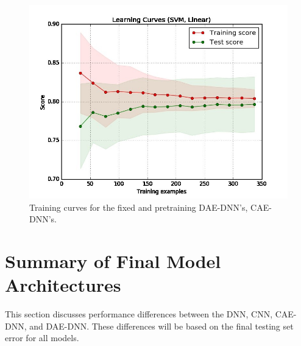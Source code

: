 \begin{figure}[H]
	\centering
	\includegraphics[width=0.8\linewidth]{model_choice_hyperparameter_search_images/learning_curve_dummy}
	\caption{Training curves for the fixed and pretraining DAE-DNN's, CAE-DNN's.}
	\label{fig:learning_curves}
\end{figure}




\section{Summary of Final Model Architectures}


This section discusses performance differences between the DNN, CNN, CAE-DNN, and DAE-DNN. These differences will be based on the final testing set error for all models.  





